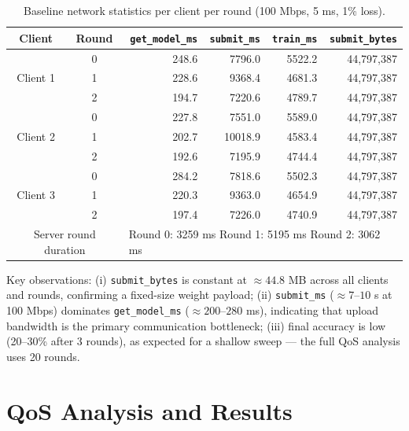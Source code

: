 \documentclass[12pt,a4paper]{report}
\begin{document}
\begin{table}[H]
\centering
\caption{Baseline network statistics per client per round (100 Mbps, 5 ms, 1\% loss).}
\label{tab:baseline}
\begin{tabular}{ccrrrr}
\toprule
Client & Round & \texttt{get\_model\_ms} & \texttt{submit\_ms} & \texttt{train\_ms} & \texttt{submit\_bytes} \\
\midrule
\multirow{3}{*}{Client 1} & 0 & 248.6 & 7796.0 & 5522.2 & 44,797,387 \\
                           & 1 & 228.6 & 9368.4 & 4681.3 & 44,797,387 \\
                           & 2 & 194.7 & 7220.6 & 4789.7 & 44,797,387 \\
\midrule
\multirow{3}{*}{Client 2} & 0 & 227.8 & 7551.0 & 5589.0 & 44,797,387 \\
                           & 1 & 202.7 & 10018.9 & 4583.4 & 44,797,387 \\
                           & 2 & 192.6 & 7195.9 & 4744.4 & 44,797,387 \\
\midrule
\multirow{3}{*}{Client 3} & 0 & 284.2 & 7818.6 & 5502.3 & 44,797,387 \\
                           & 1 & 220.3 & 9363.0 & 4654.9 & 44,797,387 \\
                           & 2 & 197.4 & 7226.0 & 4740.9 & 44,797,387 \\
\midrule
\multicolumn{2}{c}{Server round duration} & \multicolumn{4}{l}{Round 0: 3259 ms \quad Round 1: 5195 ms \quad Round 2: 3062 ms} \\
\bottomrule
\end{tabular}
\end{table}

Key observations: (i) \texttt{submit\_bytes} is constant at $\approx 44.8$ MB across all clients and rounds, confirming a fixed-size weight payload; (ii) \texttt{submit\_ms} ($\approx 7$--$10$ s at 100 Mbps) dominates \texttt{get\_model\_ms} ($\approx 200$--$280$ ms), indicating that upload bandwidth is the primary communication bottleneck; (iii) final accuracy is low (20--30\% after 3 rounds), as expected for a shallow sweep — the full QoS analysis uses 20 rounds.

\chapter{QoS Analysis and Results}
\label{ch:qos}
\end{document}
